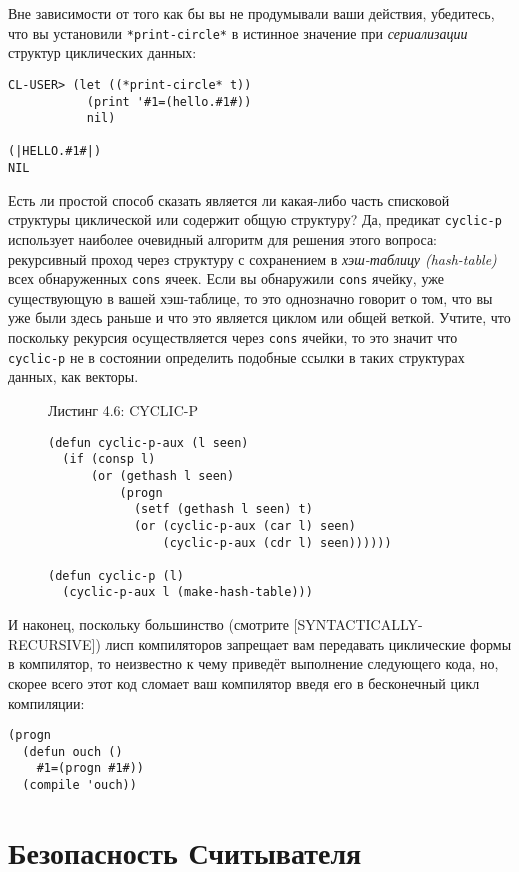 Вне зависимости от того как бы вы не продумывали ваши действия, убедитесь, что вы установили \verb"*print-circle*" в истинное значение при \emph{сериализации} структур циклических данных:

\begin{verbatim}
CL-USER> (let ((*print-circle* t))
           (print '#1=(hello.#1#))
           nil)

(|HELLO.#1#|) 
NIL
\end{verbatim}

Есть ли простой способ сказать является ли какая-либо часть списковой структуры циклической или содержит общую структуру? Да, предикат \verb"cyclic-p" использует наиболее очевидный алгоритм для решения этого вопроса: рекурсивный проход через структуру с сохранением в \emph{хэш-таблицу (hash-table)} всех обнаруженных \verb"cons" ячеек. Если вы обнаружили \verb"cons" ячейку, уже существующую в вашей хэш-таблице, то это однозначно говорит о том, что вы уже были здесь раньше и что это является циклом или общей веткой. Учтите, что поскольку рекурсия осуществляется через \verb"cons" ячейки, то это значит что \verb"cyclic-p" не в состоянии определить подобные ссылки в таких структурах данных, как векторы.

\begin{figure}Листинг 4.6: CYCLIC-P\label{listing_4.6}
\listbegin
\begin{verbatim}
(defun cyclic-p-aux (l seen)
  (if (consp l)
      (or (gethash l seen)
          (progn
            (setf (gethash l seen) t)
            (or (cyclic-p-aux (car l) seen)
                (cyclic-p-aux (cdr l) seen))))))

(defun cyclic-p (l)
  (cyclic-p-aux l (make-hash-table)))
\end{verbatim}
\listend
\end{figure}

И наконец, поскольку большинство (смотрите [SYNTACTICALLY-RECURSIVE]) лисп компиляторов запрещает вам передавать циклические формы в компилятор, то неизвестно к чему приведёт выполнение следующего кода, но, скорее всего этот код сломает ваш компилятор введя его в бесконечный цикл компиляции:

\begin{verbatim}
(progn
  (defun ouch ()
    #1=(progn #1#))
  (compile 'ouch))
\end{verbatim}

\section{Безопасность Считывателя}\label{section_reader_security}

